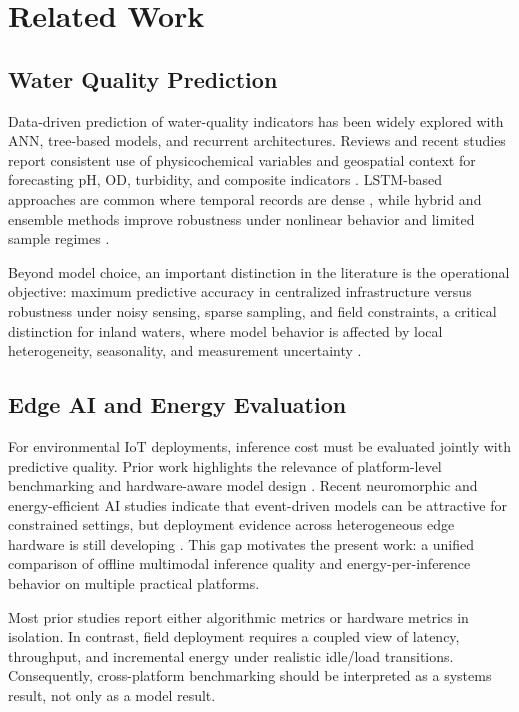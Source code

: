 \section{Related Work}

\subsection{Water Quality Prediction}
Data-driven prediction of water-quality indicators has been widely explored with ANN, tree-based models, and recurrent architectures. Reviews and recent studies report consistent use of physicochemical variables and geospatial context for forecasting pH, OD, turbidity, and composite indicators \cite{yan2024,ahmed2019,aladhaileh2021,pan2025}. LSTM-based approaches are common where temporal records are dense \cite{liu2019,pyo2023,qi2020}, while hybrid and ensemble methods improve robustness under nonlinear behavior and limited sample regimes \cite{wu2022,chadalavada2025,kalaivanan2022,palani2008}.

Beyond model choice, an important distinction in the literature is the operational objective: maximum predictive accuracy in centralized infrastructure versus robustness under noisy sensing, sparse sampling, and field constraints, a critical distinction for inland waters, where model behavior is affected by local heterogeneity, seasonality, and measurement uncertainty \cite{yan2024,lowe2022,rahu2023}.

\subsection{Edge AI and Energy Evaluation}
For environmental IoT deployments, inference cost must be evaluated jointly with predictive quality. Prior work highlights the relevance of platform-level benchmarking and hardware-aware model design \cite{rosero2020,zulkifli2022,lamrini2024,elshafeiy2023}. Recent neuromorphic and energy-efficient AI studies indicate that event-driven models can be attractive for constrained settings, but deployment evidence across heterogeneous edge hardware is still developing \cite{aral2024,azadi2025,huijbregts2024,aribe2025future}. This gap motivates the present work: a unified comparison of offline multimodal inference quality and energy-per-inference behavior on multiple practical platforms.

Most prior studies report either algorithmic metrics or hardware metrics in isolation. In contrast, field deployment requires a coupled view of latency, throughput, and incremental energy under realistic idle/load transitions. Consequently, cross-platform benchmarking should be interpreted as a systems result, not only as a model result.


